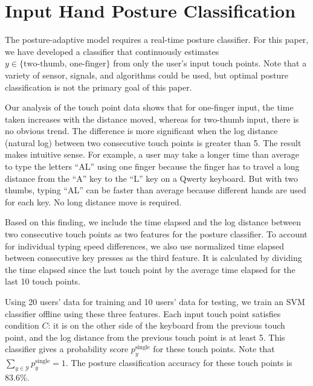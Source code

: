 \documentclass{sigchi}
\begin{document}
\section{Input Hand Posture Classification}\label{sec:posture-classification}
The posture-adaptive model requires a real-time posture classifier.  For this paper, we have developed a classifier that continuously estimates $y \in \{\text{two-thumb, one-finger}\}$ from only the user's input touch points.  Note that a variety of sensor, signals, and algorithms could be used, but optimal posture classification is not the primary goal of this paper.

Our analysis of the touch point data shows that for one-finger input, the time taken increases with the distance moved, whereas for two-thumb input, there is no obvious trend. The
difference is more significant when the log distance (natural log)
between two consecutive touch points is greater than 5. The result makes intuitive sense. For example, a user may take a longer time than average to type the letters ``AL'' using one
finger because the finger has to travel a long distance from the ``A'' key to the ``L'' key on
a Qwerty keyboard. But with two thumbs, typing ``AL'' can be faster than average because different hands are used for each key.  No long distance move is required. 

Based on this finding, we include the time elapsed and the log distance
between two consecutive touch points as two features for the posture classifier. 
To account for individual typing speed differences, we also use normalized time 
elapsed between consecutive key presses as the third feature. It is calculated 
by dividing the time elapsed since the last touch point by the average time elapsed for the last 10 touch points.

Using 20 users’ data for training and 10 users’ data for testing, we train an SVM classifier offline using these three features.  Each input touch point satisfies condition $C$: it is 
on the other side of the keyboard from the previous touch point, and the log distance from the previous touch point is at least 5. This classifier gives a probability score $p_y^{\text{single}}$ for these touch points. Note that $\displaystyle\sum_{y \in \mathcal{Y}}p_y^{\text{single}} = 1$. The posture classification accuracy for these touch points is 83.6\%.
 
\end{document}
